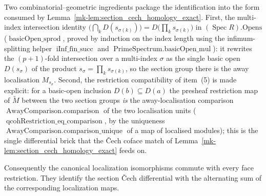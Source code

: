 \begin{definition}
  Two combinatorial--geometric ingredients package the identification into the form
  consumed by Lemma~\ref{mk-lem:section_cech_homology_exact}. First, the multi-index
  intersection identity
  \(\bigl(\bigcap_k D(s_{\sigma(k)})\bigr) = D\bigl(\prod_k s_{\sigma(k)}\bigr)\) in
  \((\operatorname{Spec} R).\mathrm{Opens}\) (\(\operatorname{basicOpen\_sprod}\), proved
  by induction on the index length using the infimum-splitting helper
  \(\operatorname{iInf\_fin\_succ}\) and \(\operatorname{PrimeSpectrum.basicOpen\_mul}\)):
  it rewrites the \((p+1)\)-fold intersection over a multi-index \(\sigma\) as the single
  basic open \(D(s_\sigma)\) of the product \(s_\sigma = \prod_k s_{\sigma(k)}\), so the
  section group there is the away localisation \(M_{s_\sigma}\). Second, the restriction
  compatibility of item~(5) is made explicit: for a basic-open inclusion
  \(D(b) \subseteq D(a)\) the presheaf restriction map of \(\widetilde{M}\) between the
  two section groups \emph{is} the away-localisation comparison
  \(\operatorname{AwayComparison.comparison}\) of the two localisation units
  (\(\operatorname{qcohRestriction\_eq\_comparison}\), by the uniqueness
  \(\operatorname{AwayComparison.comparison\_unique}\) of a map of localised modules);
  this is the single differential brick that the {\v C}ech coface match of
  Lemma~\ref{mk-lem:section_cech_homology_exact} feeds on.

  Consequently the canonical localization isomorphisms commute with every face
  restriction. They identify the section {\v C}ech differential with the alternating
  sum of the corresponding localization maps.
\end{definition}

